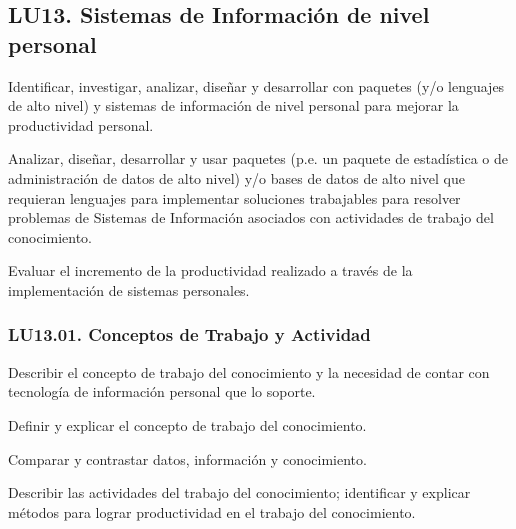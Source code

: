 \subsection{LU13. Sistemas de Información de nivel personal}\label{sec:LU13}
\begin{LearningUnit}
\begin{LUGoal}
\item Identificar, investigar, analizar, diseñar y desarrollar con paquetes (y/o lenguajes de alto nivel) y sistemas de información de nivel personal para mejorar la productividad personal.
\end{LUGoal}

\begin{LUObjective}
\item Analizar, diseñar, desarrollar y usar paquetes (p.e. un paquete de estadística o de administración de datos de alto nivel) y/o bases de datos de alto nivel que requieran lenguajes para implementar soluciones trabajables para resolver problemas de Sistemas de Información asociados con actividades de trabajo del conocimiento.
\item Evaluar el incremento de la productividad realizado a través de la implementación de sistemas personales.
\end{LUObjective}
\end{LearningUnit}

\subsubsection{LU13.01. Conceptos de Trabajo y Actividad}\label{sec:LU13.01}
\begin{LearningUnit}
\begin{LUGoal}
\item Describir el concepto de trabajo del conocimiento y la necesidad de contar con tecnología de información personal que lo soporte.
\end{LUGoal}

\begin{LUObjective}
\item Definir y explicar el concepto de trabajo del conocimiento.
\item Comparar y contrastar datos, información y conocimiento.
\item Describir las actividades del trabajo del conocimiento; identificar y explicar métodos para lograr productividad en el trabajo del conocimiento.
\end{LUObjective}
\end{LearningUnit}

